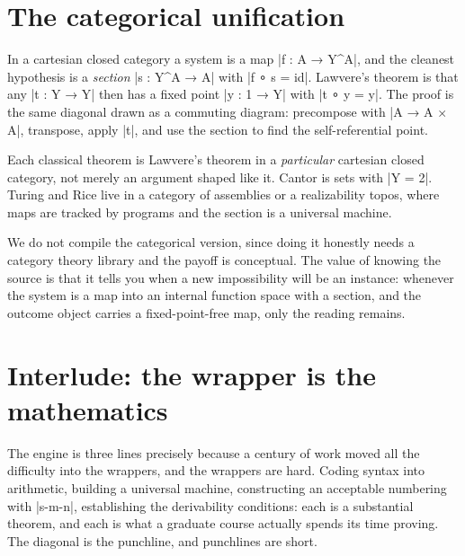 \documentclass{memoir}
\begin{document}
\section{The categorical unification}\label{Two--Schemas--of--Impossibility-005F-005F-005F--Machine--Checked--Limits--of--Trustworthy--Machine--Learning-005F-005F-005F--and--Why--They--Tighten--with--Capability----The--Classical--Limits----The--categorical--unification}

In a cartesian closed category a system is a map \LeanVerb|f : A → Y^A|, and the cleanest
hypothesis is a \emph{section} \LeanVerb|s : Y^A → A| with \LeanVerb|f ∘ s = id|. Lawvere's theorem is
that any \LeanVerb|t : Y → Y| then has a fixed point \LeanVerb|y : 1 → Y| with \LeanVerb|t ∘ y = y|. The
proof is the same diagonal drawn as a commuting diagram: precompose with \LeanVerb|A → A × A|,
transpose, apply \LeanVerb|t|, and use the section to find the self-referential point.

Each classical theorem is Lawvere's theorem in a \emph{particular} cartesian closed
category, not merely an argument shaped like it. Cantor is sets with \LeanVerb|Y = 2|.
Turing and Rice live in a category of assemblies or a realizability topos, where
maps are tracked by programs and the section is a universal machine.

We do not compile the categorical version, since doing it honestly needs a
category theory library and the payoff is conceptual. The value of knowing the
source is that it tells you when a new impossibility will be an instance:
whenever the system is a map into an internal function space with a section, and
the outcome object carries a fixed-point-free map, only the reading remains.



\section{Interlude: the wrapper is the mathematics}\label{Two--Schemas--of--Impossibility-005F-005F-005F--Machine--Checked--Limits--of--Trustworthy--Machine--Learning-005F-005F-005F--and--Why--They--Tighten--with--Capability----The--Classical--Limits----Interlude-005F-005F-005F--the--wrapper--is--the--mathematics}

The engine is three lines precisely because a century of work moved all the
difficulty into the wrappers, and the wrappers are hard. Coding syntax into
arithmetic, building a universal machine, constructing an acceptable numbering
with \LeanVerb|s-m-n|, establishing the derivability conditions: each is a substantial
theorem, and each is what a graduate course actually spends its time proving.
The diagonal is the punchline, and punchlines are short.
\end{document}
